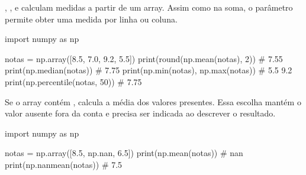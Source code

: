 , ,  e  calculam medidas a partir de um array. Assim como na soma, o parâmetro  permite obter uma medida por linha ou coluna.

\begin{exemplo}
import numpy as np

notas = np.array([8.5, 7.0, 9.2, 5.5])
print(round(np.mean(notas), 2))   # 7.55
print(np.median(notas))           # 7.75
print(np.min(notas), np.max(notas))  # 5.5 9.2
print(np.percentile(notas, 50))   # 7.75
\end{exemplo}

Se o array contém ,  calcula a média dos valores presentes. Essa escolha mantém o valor ausente fora da conta e precisa ser indicada ao descrever o resultado.

\begin{exemplo}
import numpy as np

notas = np.array([8.5, np.nan, 6.5])
print(np.mean(notas))     # nan
print(np.nanmean(notas))  # 7.5
\end{exemplo}
